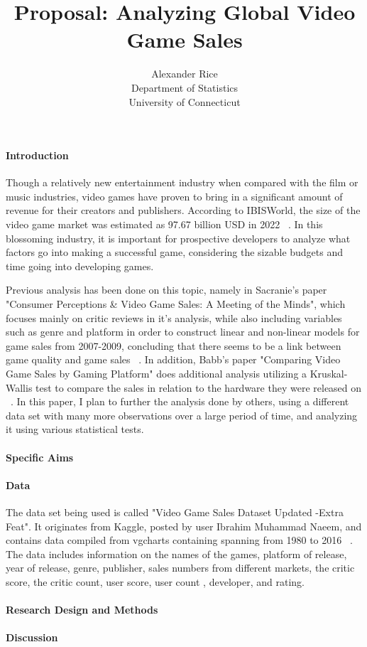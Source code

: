 \documentclass[12pt]{article}
\title{Proposal: Analyzing Global Video Game Sales}
\author{Alexander Rice\\
  Department of Statistics\\
  University of Connecticut
}
\begin{document}
\maketitle


\paragraph{Introduction}
Though a relatively new entertainment industry when compared with the film or music industries, video games have proven to bring in a significant amount of revenue for their creators and publishers. According to IBISWorld, the size of the video game market was estimated as 97.67 billion USD in 2022 ~\citep[(A)][]{Marketsizestat}.  In this blossoming industry, it is important for prospective developers to analyze what factors go into making a successful game, considering the sizable budgets and time going into developing games. 

Previous analysis has been done on this topic, namely in Sacranie's paper "Consumer Perceptions \& Video Game Sales: A Meeting of the Minds", which focuses mainly on critic reviews in it's analysis, while also including variables such as genre and platform in order to construct linear and non-linear models for game sales from 2007-2009, concluding that there seems to be a link between game quality and game sales ~\citep[(B)][]{Sacranie2010Analysis}. In addition, Babb's paper "Comparing Video Game Sales by Gaming Platform" does additional analysis utilizing a Kruskal-Wallis test to compare the sales in relation to the hardware they were released on ~\citep[(C)][]{Babb2013Analysis}. In this paper, I plan to further the analysis done by others, using a different data set with many more observations over a large period of time, and analyzing it using various statistical tests.


\paragraph{Specific Aims}


\paragraph{Data}
The data set being used is called "Video Game Sales Dataset Updated -Extra Feat". It originates from Kaggle, posted by user Ibrahim Muhammad Naeem, and contains data compiled from vgcharts containing spanning from 1980 to 2016 ~\citep[(D)][]{maindataset}. The data includes information on the names of the games, platform of release, year of  release, genre, publisher, sales numbers from different markets, the critic score, the critic count, user score, user count , developer, and rating.




\paragraph{Research Design and Methods}




\paragraph{Discussion}





\end{document}
